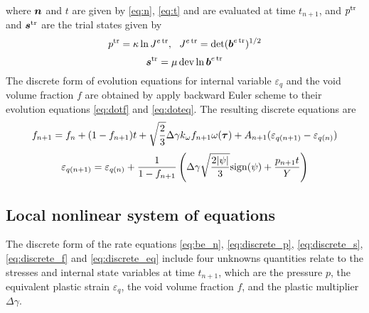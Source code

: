 \documentclass[11pt]{article}
\theoremstyle{remark}
\begin{document}
%
where ${\boldsymbol{n}}$ and $t$ are given by \eqref{eq:n}, \eqref{eq:t} and 
are evaluated at time $t_{n+1}$, and $p^{\operatorname{\text{tr}}}$ and ${\boldsymbol{s}}^{\operatorname{\text{tr}}}$ are the 
trial states given by
%
\begin{equation}\label{eq:ptr}
p^{\operatorname{\text{tr}}} = \kappa\ln J^{e\operatorname{\text{tr}}},~~J^{e\operatorname{\text{tr}}} = \det({\boldsymbol{b}}^{e\operatorname{\text{tr}}})^{1/2}
\end{equation}
%
\begin{equation}\label{eq:str}
{\boldsymbol{s}}^{\operatorname{\text{tr}}} = \mu\operatorname{\text{dev}}\ln{\boldsymbol{b}}^{e\operatorname{\text{tr}}}
\end{equation}
%
The discrete form of evolution equations for internal variable 
$\varepsilon_q$ and the void volume fraction $f$ are obtained by apply 
backward Euler scheme to their evolution equations \eqref{eq:dotf} and 
\eqref{eq:doteq}. The resulting discrete equations are
%
\begin{equation}\label{eq:discrete_f}
f_{n+1} = f_n + (1-f_{n+1})t + \sqrt{\frac{2}{3}}\Delta\gamma
k_{\omega}f_{n+1} \omega({\boldsymbol{\tau}}) + A_{n+1}(\varepsilon_{q(n+1)} - 
\varepsilon_{q(n)})
\end{equation}
%
\begin{equation}\label{eq:discrete_eq}
\varepsilon_{q(n+1)} = \varepsilon_{q(n)} + \frac{1}{1-f_{n+1}}
\left(\Delta\gamma\sqrt{\frac{2|\psi|}{3}} {\rm sign}(\psi) + 
\frac{p_{n+1} t}{Y}\right)
\end{equation}


\subsection{Local nonlinear system of equations}
The discrete form of the rate equations \eqref{eq:be_n}, 
\eqref{eq:discrete_p}, \eqref{eq:discrete_s}, \eqref{eq:discrete_f} 
and \eqref{eq:discrete_eq} include four unknowns quantities relate to 
the stresses and internal state variables at time $t_{n+1}$, which 
are the pressure $p$, the equivalent plastic strain $\varepsilon_q$, 
the void volume fraction $f$, and the plastic multiplier $\Delta
\gamma$.
\end{document}
